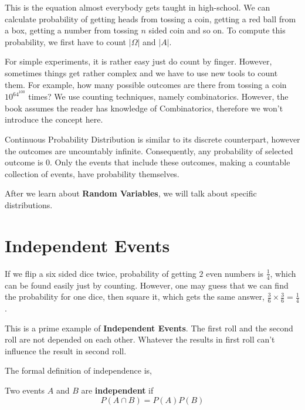 This is the equation almost everybody gets taught in high-school. We can calculate probability of getting heads from tossing a coin,
getting a red ball from a box, getting a number from tossing $n$ sided coin and so on.
To compute this probability, we first have to count $ | \Omega | $ and $|A |$.

For simple experiments, it is rather easy just do count by finger.
However, sometimes things get rather complex and we have to use new tools to count them. For example, how many possible outcomes are there
from tossing a coin $10^{64^{100}}$ times? We use counting techniques, namely combinatorics. However, the book assumes the reader has
knowledge of Combinatorics, therefore we won't introduce the concept here.

\par

Continuous Probability Distribution is similar to its discrete counterpart, however the outcomes are uncountably infinite. Consequently,
any probability of selected outcome is $0$. Only the events that include these outcomes, making a countable collection of events, have
probability themselves.

\par

After we learn about \textbf{Random Variables}, we will talk about specific distributions.

\section{Independent Events}
If we flip  a six sided dice twice, probability of getting $2$ even numbers is $ \frac{1}{4}$, which can be found easily just by counting.
However, one may guess that we can find the probability for one dice, then square it, which gets the same answer, $\frac{3}{6} \times
\frac{3}{6}= \frac{1}{4}$.

\par

This is a prime example of \textbf{Independent Events}. The first roll and the second roll are not depended on each other. Whatever the
results in first roll can't influence the result in second roll.

The formal definition of independence is,

\begin{definition}
    Two events $A$ and $B$ are \textbf{independent}  if
    $$ P(A \cap B) = P(A)P(B)$$
\end{definition}
\par

